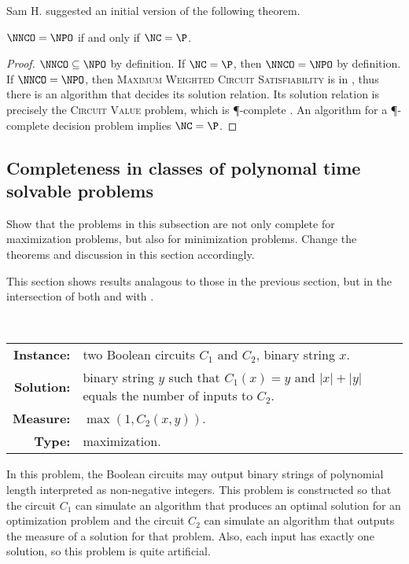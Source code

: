 \documentclass[]{article}
\begin{document}
Sam H. suggested an initial version of the following theorem.

\begin{theorem}\label{thm:nnconpo}
  $\NNCO = \NPO$ if and only if $\NC = \P$.
\end{theorem}
\begin{proof}
  $\NNCO \subseteq \NPO$ by definition.
  If $\NC = \P$, then $\NNCO = \NPO$ by definition.
  If $\NNCO = \NPO$, then \textsc{Maximum Weighted Circuit Satisfiability} is in \NNCO{}, thus there is an \NC{} algorithm that decides its solution relation.
  Its solution relation is precisely the \textsc{Circuit Value} problem, which is \P-complete \cite[Problem~A.1.1]{ghr95}.
  An \NC{} algorithm for a \P-complete decision problem implies $\NC = \P$.
\end{proof}

\subsection{Completeness in classes of polynomal time solvable problems}

\begin{todo}
  Show that the problems in this subsection are not only complete for maximization problems, but also for minimization problems.
  Change the theorems and discussion in this section accordingly.
\end{todo}

This section shows results analagous to those in the previous section, but in the intersection of both \NPO{} and \NNCO{} with \PO.

\begin{definition}
  \mbox{} \\
  \begin{tabular}{r p{9.5cm}}
    \textbf{Instance:} & two Boolean circuits $C_1$ and $C_2$, binary string $x$. \\
    \textbf{Solution:} & binary string $y$ such that $C_1(x) = y$ and $|x| + |y|$ equals the number of inputs to $C_2$. \\
    \textbf{Measure:} & $\max(1, C_2(x, y))$. \\
    \textbf{Type:} & maximization.
  \end{tabular}
\end{definition}

In this problem, the Boolean circuits may output binary strings of polynomial length interpreted as non-negative integers.
This problem is constructed so that the circuit $C_1$ can simulate an algorithm that produces an optimal solution for an optimization problem and the circuit $C_2$ can simulate an algorithm that outputs the measure of a solution for that problem.
Also, each input has exactly one solution, so this problem is quite artificial.
\end{document}
